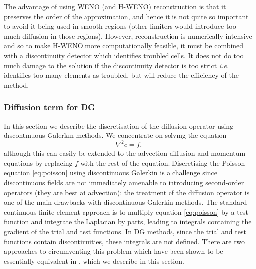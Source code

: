 The advantage of using WENO (and H-WENO) reconstruction is that it
preserves the order of the approximation, and hence it is not quite so
important to avoid it being used in smooth regions (other limiters
would introduce too much diffusion in those regions). However,
reconstruction is numerically intensive and so to make H-WENO more
computationally feasible, it must be combined with a discontinuity
detector which identifies troubled cells. It does not do too much
damage to the solution if the discontinuity detector is too strict
\emph{i.e.}  identifies too many elements as troubled, but will reduce
the efficiency of the method.

\subsubsection{Diffusion term for DG}
\label{sec:NM_DG_diffusion}
 In this section we describe
the discretisation of the diffusion operator using discontinuous
Galerkin methods. We concentrate on solving the equation
\begin{equation}
\label{eq:poisson}
\nabla^2 c = f,
\end{equation}
although this can easily be extended to the advection-diffusion and
momentum equations by replacing $f$ with the rest of the equation.
Discretising the Poisson equation \eqref{eq:poisson} using
discontinuous Galerkin is a challenge since discontinuous fields are
not immediately amenable to introducing second-order operators (they
are best at advection): the treatment of the diffusion operator is one
of the main drawbacks with discontinuous Galerkin methods.  The
standard continuous finite element approach is to multiply equation
\eqref{eq:poisson} by a test function and integrate the Laplacian by
parts, leading to integrals containing the gradient of the trial and
test functions. In DG methods, since the trial and test functions contain
discontinuities, these integrals are not defined. There are two
approaches to circumventing this problem which have been shown to be
essentially equivalent in \cite{arnold2002}, which we describe in this
section.

